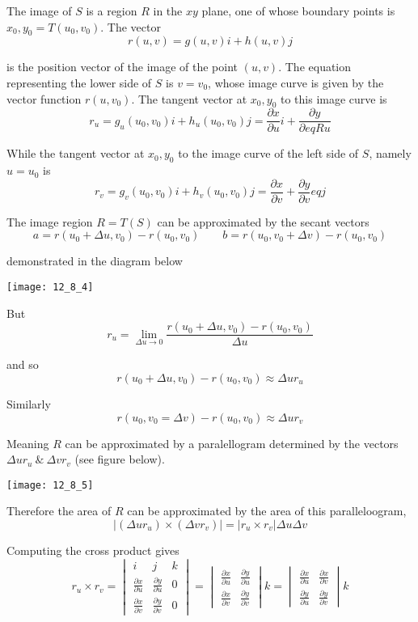 \documentclass{article}
\begin{document}
  The image of $ S $ is a region $ R $ in the $ xy $ plane, one of whose boundary points is $ x_0,y_0 =T(u_0,v_0) $. The vector
  \[
    r(u,v) = g(u,v)i+ h(u,v)j
  \]

  is the position vector of the image of the point $ (u,v) $. The equation representing the lower side of $ S $  is $ v=v_0 $, whose image curve is given by the vector function $ r(u,v_0) $. The tangent vector at $ x_0,y_0 $ to this image curve is
  \[
    r_u= g_u(u_0,v_0)i + h_u(u_0,v_0)j = \frac{\partial x}{\partial u}i + \frac{\partial y}{\partial eqRu}
  \]

  While the tangent vector at $ x_0,y_0 $ to the image curve of the left side of $ S $, namely $ u=u_0 $ is
  \[
    r_v = g_v(u_0, v_0)i + h_v(u_0, v_0)j = \frac{\partial x}{\partial v} + \frac{\partial y}{\partial v}eqj
  \]

  The image region $ R=T(S) $ can be approximated by the secant vectors
  \[
    a=r(u_0+ \Delta u,v_0) - r(u_0,v_0) \qquad b=r(u_0,v_0 + \Delta v) - r(u_0,v_0)
  \]

  demonstrated in the diagram below
  \begin{center}
    \texttt{[image: 12\_8\_4]}
  \end{center}

  But
  \[
    r_u = \lim_{\Delta u \to 0}{\frac{r(u_0+ \Delta u, v_0) - r(u_0,v_0)}{\Delta u}}
  \]

  and so 
  \[
    r(u_0+\Delta u, v_0) - r(u_0,v_0) \approx \Delta u r_u
  \]

  Similarly
  \[
    r(u_0, v_0 = \Delta v) - r(u_0,v_0) \approx \Delta u r_v
  \]

  Meaning $ R $ can be approximated by a paralellogram determined by the vectors $ \Delta u r_u ~\&~ \Delta vr_v $ (see figure below).
  \begin{center}
    \texttt{[image: 12\_8\_5]}
  \end{center}

  Therefore the area of $ R $ can be approximated by the area of this paralleloogram,
  \[
    \bigg| (\Delta u r_u) \times (\Delta v r_v) \bigg| = \bigg| r_u \times r_v \bigg| \Delta u \Delta v
  \]

  Computing the cross product gives
  \[
    r_u \times r_v = 
    \begin{vmatrix}
    i &j &k\\
    \frac{\partial x}{\partial u} &\frac{\partial y}{\partial u} &0\\
    \frac{\partial x}{\partial v} &\frac{\partial y}{\partial v} &0
    \end{vmatrix} =
    \begin{vmatrix}
    \frac{\partial x}{\partial u} &\frac{\partial y}{\partial u}\\
    \frac{\partial x}{\partial v} &\frac{\partial y}{\partial v}
    \end{vmatrix}k =
    \begin{vmatrix}
    \frac{\partial x}{\partial u} &\frac{\partial x}{\partial v}\\
    \frac{\partial y}{\partial u} &\frac{\partial y}{\partial v}
    \end{vmatrix}k
  \]
\end{document}

